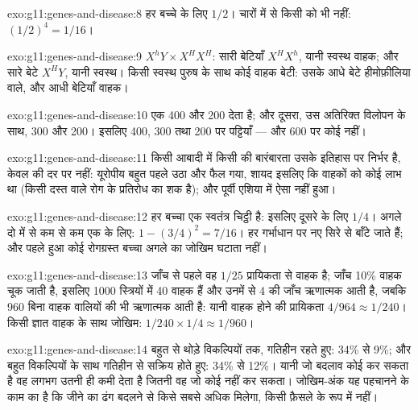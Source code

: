 \begin{solution}{exo:g11:genes-and-disease:8}
हर बच्चे के लिए $1/2$। चारों में से किसी को भी नहीं: $(1/2)^4 = 1/16$।
\end{solution}

\begin{solution}{exo:g11:genes-and-disease:9}
$X^hY \times X^HX^H$: सारी बेटियाँ $X^HX^h$, यानी स्वस्थ वाहक; और सारे
बेटे $X^HY$, यानी स्वस्थ। किसी स्वस्थ पुरुष के साथ कोई वाहक बेटी: उसके आधे
बेटे हीमोफ़ीलिया वाले, और आधी बेटियाँ वाहक।
\end{solution}

\begin{solution}{exo:g11:genes-and-disease:10}
एक  400 और 200 देता है; और दूसरा, उस अतिरिक्त विलोपन के साथ, 300
और 200। इसलिए 400, 300 तथा 200 पर पट्टियाँ --- और 600 पर कोई नहीं।
\end{solution}

\begin{solution}{exo:g11:genes-and-disease:11}
किसी आबादी में किसी  की बारंबारता उसके इतिहास पर निर्भर है, केवल
 की दर पर नहीं: यूरोपीय  बहुत पहले उठा और फैल गया, शायद
इसलिए कि वाहकों को कोई लाभ था (किसी दस्त वाले रोग के प्रतिरोध का शक है);
और पूर्वी एशिया में ऐसा नहीं हुआ।
\end{solution}

\begin{solution}{exo:g11:genes-and-disease:12}
हर बच्चा एक स्वतंत्र चिट्ठी है: इसलिए दूसरे के लिए $1/4$। अगले दो में से
कम से कम एक के लिए: $1 - (3/4)^2 = 7/16$। हर गर्भाधान पर  नए सिरे
से बाँटे जाते हैं; और पहले हुआ कोई रोगग्रस्त बच्चा अगले का जोखिम घटाता
नहीं।
\end{solution}

\begin{solution}{exo:g11:genes-and-disease:13}
जाँच से पहले वह $1/25$ प्रायिकता से वाहक है; जाँच 10\% वाहक चूक जाती है,
इसलिए 1000 स्त्रियों में 40 वाहक हैं और उनमें से 4 की जाँच ऋणात्मक आती है,
जबकि 960 बिना वाहक वालियों की भी ऋणात्मक आती है: यानी वाहक होने की
प्रायिकता $4/964 \approx 1/240$। किसी ज्ञात वाहक के साथ जोखिम:
$1/240 \times 1/4
\approx 1/960$।
\end{solution}

\begin{solution}{exo:g11:genes-and-disease:14}
बहुत से थोड़े विकल्पियों तक, गतिहीन रहते हुए: 34\% से 9\%; और बहुत
विकल्पियों के साथ गतिहीन से सक्रिय होते हुए: 34\% से 12\%। यानी जो बदलाव
कोई कर सकता है वह लगभग उतनी ही कमी देता है जितनी वह जो कोई नहीं कर सकता।
जोखिम-अंक यह पहचानने के काम का है कि जीने का ढंग बदलने से किसे सबसे अधिक
मिलेगा, किसी फ़ैसले के रूप में नहीं।
\end{solution}

